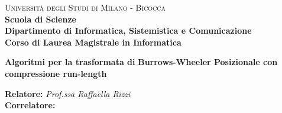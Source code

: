 \documentclass[a4paper,12pt, oneside]{book}
\begin{document}
{} 
\begin{titlepage}
  

  \noindent
  \begin{minipage}[t]{0.19\textwidth}
  \end{minipage}
  \begin{minipage}[t]{0.81\textwidth}
    {
      {\textsc{Università degli Studi di Milano - Bicocca}} \\
      \textbf{Scuola di Scienze} \\
      \textbf{Dipartimento di Informatica, Sistemistica e Comunicazione} \\
      \textbf{Corso di Laurea Magistrale in Informatica} \\
      \par
    }
  \end{minipage}
  
  \vspace{40mm}
  
  \begin{center}
    {\LARGE{
        \textbf{Algoritmi per la trasformata di}}}
    \vspace{1mm}
    {\LARGE{
        \textbf{Burrows-Wheeler Posizionale con}}}
    \vspace{1mm}
    {\LARGE{
        \textbf{compressione run-length}}}
    
  \end{center}
  
  \vspace{48mm}

  \noindent
  {\large \textbf{Relatore:} \textit{Prof.ssa Raffaella Rizzi}} \\

  \noindent
  {\large \textbf{Correlatore:} \textit{}}
  

\end{titlepage}
\end{document}
